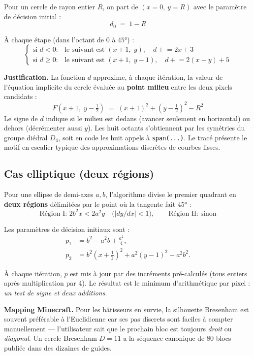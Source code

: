 \documentclass[12pt,a4paper]{scrartcl}
\newcommand{\code}[1]{\texttt{\small #1}}
\newcommand{\acc}[1]{\textcolor{accent}{\textbf{#1}}}
\begin{document}
Pour un cercle de rayon entier $R$, on part de $(x{=}0,\,y{=}R)$ avec le paramètre de décision initial :
\[
d_0 \;=\; 1 - R
\]

À chaque étape (dans l'octant de $0$ à $45°$) :
\[
\begin{cases}
\text{si } d < 0: & \text{le suivant est } (x{+}1,\;y), \quad d \mathrel{+}= 2x+3 \\[2pt]
\text{si } d \geq 0: & \text{le suivant est } (x{+}1,\;y{-}1), \quad d \mathrel{+}= 2(x-y)+5
\end{cases}
\]

\textbf{Justification.} La fonction $d$ approxime, à chaque itération, la valeur de l'équation implicite du cercle évaluée au \acc{point milieu} entre les deux pixels candidats :
\[
F\!\left(x+1,\;y-\tfrac{1}{2}\right) \;=\; (x+1)^2 + \left(y-\tfrac{1}{2}\right)^{\!2} - R^2
\]
Le signe de $d$ indique si le milieu est dedans (avancer seulement en horizontal) ou dehors (décrémenter aussi $y$). Les huit octants s'obtiennent par les symétries du groupe diédral $D_4$, soit en code les huit appels à \code{span(...)}. Le tracé présente le motif en escalier typique des approximations discrètes de courbes lisses.

\subsection{Cas elliptique (deux régions)}

Pour une ellipse de demi-axes $a, b$, l'algorithme divise le premier quadrant en \acc{deux régions} délimitées par le point où la tangente fait $45°$ :
\[
\text{Région I: } 2b^2 x < 2a^2 y \quad \bigl(|dy/dx| < 1\bigr),
\qquad
\text{Région II: sinon}
\]

Les paramètres de décision initiaux sont :
\begin{align*}
p_1 &= b^2 - a^2 b + \tfrac{a^2}{4}, \\
p_2 &= b^2\!\left(x+\tfrac{1}{2}\right)^{\!2} + a^2\!\left(y-1\right)^{\!2} - a^2 b^2.
\end{align*}

À chaque itération, $p$ est mis à jour par des incréments pré-calculés (tous entiers après multiplication par 4). Le résultat est le minimum d'arithmétique par pixel : \emph{un test de signe et deux additions}.

\begin{minec}
\textbf{Mapping Minecraft.} Pour les bâtisseurs en survie, la silhouette Bresenham est souvent préférable à l'Euclidienne car ses pas discrets sont faciles à compter manuellement --- l'utilisateur sait que le prochain bloc est toujours \emph{droit} ou \emph{diagonal}. Un cercle Bresenham $D=11$ a la séquence canonique de $80$ blocs publiée dans des dizaines de guides.
\end{minec}
\end{document}
